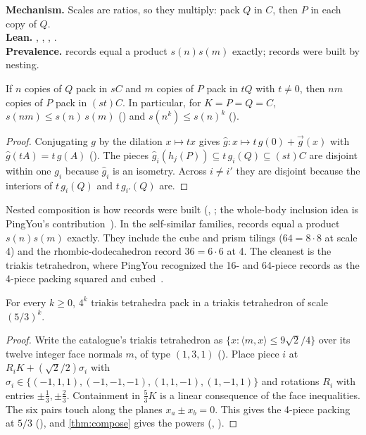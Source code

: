 \documentclass[11pt,a4paper]{article}
\begin{document}
\begin{summarybox}
\textbf{Mechanism.} Scales are ratios, so they multiply: pack $Q$ in $C$, then $P$ in each copy of $Q$.\\
\textbf{Lean.} , , , .\\
\textbf{Prevalence.} \nComposites{} records equal a product $s(n)s(m)$ exactly; \nNested{} records were built by nesting.
\end{summarybox}

\begin{theorem}\label{thm:compose}
If $n$ copies of $Q$ pack in $sC$ and $m$ copies of $P$ pack in $tQ$ with $t\ne 0$, then $nm$ copies of $P$ pack in $(st)C$. In particular, for $K=P=Q=C$, $s(nm)\le s(n)\,s(m)$ () and $s(n^k)\le s(n)^k$ ().
\end{theorem}
\begin{proof}
Conjugating $g$ by the dilation $x\mapsto tx$ gives $\hat g\colon x\mapsto t\,g(0)+\vec g(x)$ with $\hat g(tA)=t\,g(A)$ (). The pieces $\hat g_i(h_j(P))\subseteq t\,g_i(Q)\subseteq (st)C$ are disjoint within one $g_i$ because $\hat g_i$ is an isometry. Across $i\ne i'$ they are disjoint because the interiors of $t\,g_i(Q)$ and $t\,g_{i'}(Q)$ are.
\end{proof}

Nested composition is how \nNested{} records were built (, ; the whole-body inclusion idea is PingYou's contribution~\cite{ping79}). In the self-similar families, \nComposites{} records equal a product $s(n)s(m)$ exactly. They include the cube and prism tilings ($64=8\cdot 8$ at scale 4) and the rhombic-dodecahedron record $36=6\cdot6$ at 4. The cleanest is the triakis tetrahedron, where PingYou recognized the 16- and 64-piece records as the 4-piece packing squared and cubed~\cite{pingSixteen}.

\begin{theorem}\label{thm:triakis}
For every $k\ge0$, $4^k$ triakis tetrahedra pack in a triakis tetrahedron of scale $(5/3)^k$.
\end{theorem}
\begin{proof}
Write the catalogue's triakis tetrahedron as $\{x:\langle m,x\rangle\le 9\sqrt2/4\}$ over its twelve integer face normals $m$, of type $(1,3,1)$ (). Place piece $i$ at $R_iK+(\sqrt2/2)\sigma_i$ with $\sigma_i\in\{(-1,1,1),(-1,-1,-1),(1,1,-1),(1,-1,1)\}$ and rotations $R_i$ with entries $\pm\frac13,\pm\frac23$. Containment in $\frac53K$ is a linear consequence of the face inequalities. The six pairs touch along the planes $x_a\pm x_b=0$. This gives the 4-piece packing at $5/3$ (), and \cref{thm:compose} gives the powers (, ).
\end{proof}
\end{document}
